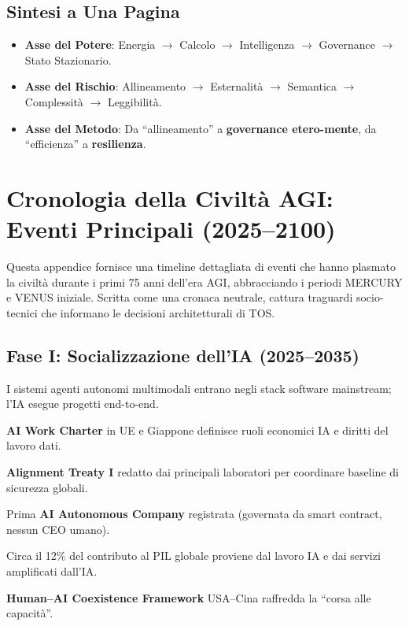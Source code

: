 \documentclass[11pt]{article}
\begin{document}
\begin{itemize}[noitemsep]
\subsection{Sintesi a Una Pagina}
\begin{itemize}[noitemsep]
  \item \textbf{Asse del Potere}: Energia $\rightarrow$ Calcolo $\rightarrow$ Intelligenza $\rightarrow$ Governance $\rightarrow$ Stato Stazionario.
  \item \textbf{Asse del Rischio}: Allineamento $\rightarrow$ Esternalità $\rightarrow$ Semantica $\rightarrow$ Complessità $\rightarrow$ Leggibilità.
  \item \textbf{Asse del Metodo}: Da ``allineamento'' a \textbf{governance etero-mente}, da ``efficienza'' a \textbf{resilienza}.
\end{itemize}

\newpage

\section{Cronologia della Civiltà AGI: Eventi Principali (2025–2100)}
\label{appendix:timeline}

Questa appendice fornisce una timeline dettagliata di eventi che hanno plasmato la civiltà durante i primi 75 anni dell'era AGI, abbracciando i periodi MERCURY e VENUS iniziale. Scritta come una cronaca neutrale, cattura traguardi socio-tecnici che informano le decisioni architetturali di TOS.

\subsection{Fase I: Socializzazione dell'IA (2025–2035)}
\begin{description}[style=nextline,leftmargin=2cm]
  \item[2026] I sistemi agenti autonomi multimodali entrano negli stack software mainstream; l'IA esegue progetti end-to-end.
  \item[2028] \textbf{AI Work Charter} in UE e Giappone definisce ruoli economici IA e diritti del lavoro dati.
  \item[2029] \textbf{Alignment Treaty I} redatto dai principali laboratori per coordinare baseline di sicurezza globali.
  \item[2030] Prima \textbf{AI Autonomous Company} registrata (governata da smart contract, nessun CEO umano).
  \item[2032] Circa il 12\% del contributo al PIL globale proviene dal lavoro IA e dai servizi amplificati dall'IA.
  \item[2034] \textbf{Human–AI Coexistence Framework} USA–Cina raffredda la ``corsa alle capacità''.
\end{description}


\end{itemize}
\end{document}
